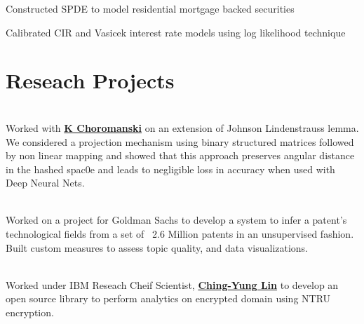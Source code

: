 \documentclass[letterpaper]{deedy-resume} %
\begin{document}
\begin{minipage}[t]{0.66\textwidth}
\sectionspace %



\begin{tightitemize}
\item Constructed SPDE to model residential mortgage backed securities
\item Calibrated CIR and Vasicek interest rate models using log likelihood technique 
\end{tightitemize}

\sectionspace %


\section{Reseach Projects}

\\
Worked with \textbf{\href{www.kchoromanski.com}{K Choromanski}} on an extension of Johnson Lindenstrauss lemma. We considered a projection mechanism using binary structured matrices followed by non linear mapping and showed that this approach preserves angular distance in the hashed spac0e and leads to negligible loss in accuracy when used with Deep Neural Nets.

\sectionspace %


\\
Worked on a project for Goldman Sachs to develop a system to infer a patent's technological fields from a set of ~2.6 Million patents in an unsupervised fashion. Built custom measures to assess topic quality, and data visualizations.

\sectionspace %



\\
Worked under IBM Reseach Cheif Scientist, \textbf{\href{http://researcher.watson.ibm.com/researcher/view.php?person=us-chingyung}{Ching-Yung Lin}} to develop an open source library to perform analytics on encrypted domain using NTRU encryption.



\end{minipage}
\end{document}
